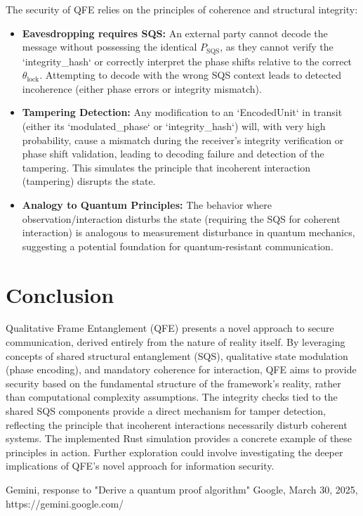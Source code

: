 \documentclass[11pt]{article}
\newcommand{\SQS}{P_{\text{SQS}}}        %
\newcommand{\SQSphase}{\theta_{\text{lock}}} %
\begin{document}
	The security of QFE relies on the principles of coherence and structural integrity:
	\begin{itemize}
		\item \textbf{Eavesdropping requires SQS:} An external party cannot decode the message without possessing the identical $\SQS$, as they cannot verify the `integrity\_hash` or correctly interpret the phase shifts relative to the correct $\SQSphase$. Attempting to decode with the wrong SQS context leads to detected incoherence (either phase errors or integrity mismatch).
		\item \textbf{Tampering Detection:} Any modification to an `EncodedUnit` in transit (either its `modulated\_phase` or `integrity\_hash`) will, with very high probability, cause a mismatch during the receiver's integrity verification or phase shift validation, leading to decoding failure and detection of the tampering. This simulates the principle that incoherent interaction (tampering) disrupts the state.
		\item \textbf{Analogy to Quantum Principles:} The behavior where observation/interaction disturbs the state (requiring the SQS for coherent interaction) is analogous to measurement disturbance in quantum mechanics, suggesting a potential foundation for quantum-resistant communication.
	\end{itemize}
	
	\section{Conclusion}
	
	Qualitative Frame Entanglement (QFE) presents a novel approach to secure communication, derived entirely from the nature of reality itself. By leveraging concepts of shared structural entanglement (SQS), qualitative state modulation (phase encoding), and mandatory coherence for interaction, QFE aims to provide security based on the fundamental structure of the framework's reality, rather than computational complexity assumptions. The integrity checks tied to the shared SQS components provide a direct mechanism for tamper detection, reflecting the principle that incoherent interactions necessarily disturb coherent systems. The implemented Rust simulation provides a concrete example of these principles in action. Further exploration could involve investigating the deeper implications of QFE's novel approach for information security.
	
	\begin{thebibliography}{1}
		Gemini, response to "Derive a quantum proof algorithm" Google, March 30, 2025, https://gemini.google.com/ 	
	\end{thebibliography}
	
	
\end{document}
